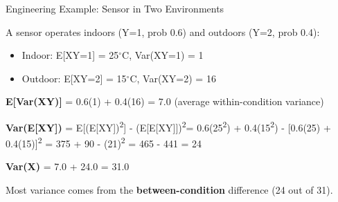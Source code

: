 \begin{PSbox}[unbreakable]{ex}{Engineering Example: Sensor in Two Environments}

A sensor operates indoors (Y=1, prob 0.6) and outdoors (Y=2, prob 0.4):

\begin{itemize}
\tightlist
\item
  Indoor: E[X\textbar{}Y=1] = 25\ensuremath{^{\circ}}C, Var(X\textbar{}Y=1) = 1
\item
  Outdoor: E[X\textbar{}Y=2] = 15\ensuremath{^{\circ}}C, Var(X\textbar{}Y=2) = 16
\end{itemize}

\textbf{E[Var(X\textbar{}Y)]} = 0.6(1) + 0.4(16) = 7.0 (average within-condition variance)

\textbf{Var(E[X\textbar{}Y])} = E[(E[X\textbar{}Y])\textsuperscript{2}] - (E[E[X\textbar{}Y]])\textsuperscript{2}\PSbr{}= 0.6(25\textsuperscript{2}) + 0.4(15\textsuperscript{2}) - [0.6(25) + 0.4(15)]\textsuperscript{2} = 375 + 90 - (21)\textsuperscript{2} = 465 - 441 = 24

\textbf{Var(X)} = 7.0 + 24.0 = 31.0

Most variance comes from the \textbf{between-condition} difference (24 out of 31).

\end{PSbox}


